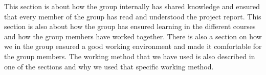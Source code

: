 This section is about how the group internally has shared knowledge and ensured that every member of the group has read and understood the project report. This section is also about how the group has ensured learning in the different courses and how the group members have worked together. There is also a section on how we in the group ensured a good working environment and made it comfortable for the group members. The working method that we have used is also described in one of the sections and why we used that specific working method.